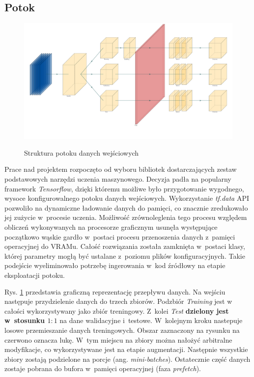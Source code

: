 \subsection{Potok}

\vspace{0.5cm}
\begin{figure}[h]
    \centering
    \includegraphics[scale=0.2]{img/pipe.pdf}
    \label{pipe_img}
    \caption{Struktura potoku danych wejściowych}
\end{figure}
\vspace{0.5cm}

Prace nad projektem rozpoczęto od wyboru bibliotek dostarczających zestaw podstawowych narzędzi uczenia maszynowego. Decyzja padła na popularny framework \textit{Tensorflow}, dzięki któremu możliwe było przygotowanie wygodnego, wysoce konfigurowalnego potoku danych wejściowych. Wykorzystanie \textit{tf.data} API pozwoliło na dynamiczne ładowanie danych do pamięci, co znacznie zredukowało jej zużycie  w~procesie uczenia. Możliwość zrównoleglenia tego procesu względem obliczeń wykonywanych na procesorze graficznym usunęła występujące początkowo wąskie gardło w~postaci procesu przenoszenia danych z~pamięci operacyjnej do VRAMu. Całość rozwiązania została zamknięta w~postaci klasy, której parametry mogłą być ustalane z~poziomu plików konfiguracyjnych. Takie podejście wyeliminowało potrzebę ingerowania w~kod źródłowy na etapie eksploatacji potoku. 

Rys. \ref{pipe_img} przedstawia graficzną reprezentację przepływu danych. Na wejściu następuje przydzielenie danych do trzech zbiorów. Podzbiór \textit{Training} jest w całości wykorzystywany jako zbiór treningowy. Z~kolei \textit{Test} \textbf{dzielony jest w~stosunku $1:1$} na dane walidacyjne i~testowe. W~kolejnym kroku nastepuje losowe przemieszanie danych treningowych. Obszar zaznaczony na rysunku na czerwono oznacza lukę. W~tym miejscu na zbiory można nałożyć arbitralne modyfikacje, co wykorzystywane jest na etapie augmentacji. Następnie wszystkie zbiory zostają podzielone na porcje (ang. \textit{mini-batches}). Ostatecznie część danych zostaje pobrana do bufora w~pamięci operacyjnej (faza \textit{prefetch}).
